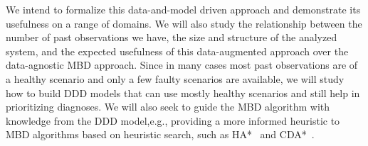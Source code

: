 \documentclass[12pt]{article}
\begin{document}


 



We intend to formalize this data-and-model driven approach and demonstrate its usefulness on a range of domains. We will also study the relationship between the number of past observations we have, the size and structure of the analyzed system, and the expected usefulness of this data-augmented approach over the data-agnostic MBD approach. Since in many cases most past observations are of a healthy scenario and only a few faulty scenarios are available, we will study how to build DDD models that can use mostly healthy scenarios and still help in prioritizing diagnoses. We will also seek to guide the MBD algorithm with knowledge from the DDD model,e.g., providing a more informed heuristic to MBD algorithms based on heuristic search, such as HA*~\cite{feldman2006two} and CDA*~\cite{williams2007conflict}. %
\end{document}
